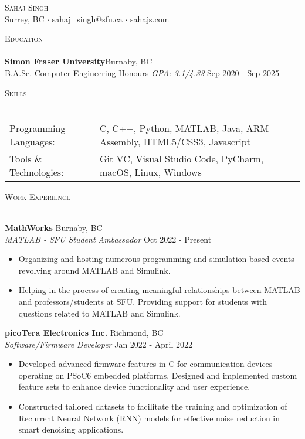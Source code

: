 \documentclass[a4paper]{article}
\newcommand{\lineunder} {
    \vspace*{-8pt} \\
    \hspace*{-18pt} \hrulefill \\
}
\newcommand{\header} [1] {
    {\hspace*{-18pt}\vspace*{6pt} \textsc{#1}}
    \vspace*{-6pt} \lineunder
}
\begin{document}
\vspace*{-40pt}

\vspace*{-10pt}
\begin{center}
	{\Huge \scshape {Sahaj Singh}}\\
	Surrey, BC $\cdot$ sahaj\_singh@sfu.ca $\cdot$ sahajs.com\\
\end{center}

\header{Education}
\textbf{Simon Fraser University}\hfill Burnaby, BC\\
B.A.Sc. Computer Engineering Honours \textit{GPA: 3.1/4.33} \hfill Sep 2020 - Sep 2025\\
\vspace{1mm}

\header{Skills}
\begin{tabular}{ l l }
	Programming Languages: & C, C++, Python, MATLAB, Java, ARM Assembly, HTML5/CSS3, Javascript \\
	Tools \& Technologies: & Git VC, Visual Studio Code, PyCharm, macOS, Linux, Windows         \\
\end{tabular}
\vspace{1mm}

\header{Work Experience}
\vspace{1mm}

\textbf{MathWorks} \hfill Burnaby, BC\\
\textit{MATLAB - SFU Student Ambassador} \hfill Oct 2022 - Present\\
\vspace{-3mm}
\begin{itemize} \itemsep -3pt
	\item Organizing and hosting numerous programming and simulation based events revolving around MATLAB and Simulink.
	\item Helping in the process of creating meaningful relationships between MATLAB and professors/students at SFU. Providing support for students with questions related to MATLAB and Simulink.
\end{itemize}
\vspace{-2mm}
\textbf{picoTera Electronics Inc.} \hfill Richmond, BC\\
\textit{Software/Firmware Developer} \hfill Jan 2022 - April 2022\\
\vspace{-3mm}
\begin{itemize} \itemsep -3pt
	\item Developed advanced firmware features in C for communication devices operating on PSoC6 embedded platforms. Designed and implemented custom feature sets to enhance device functionality and user experience.
	\item Constructed tailored datasets to facilitate the training and optimization of Recurrent Neural Network (RNN) models for effective noise reduction in smart denoising applications.
\end{itemize}
\end{document}
